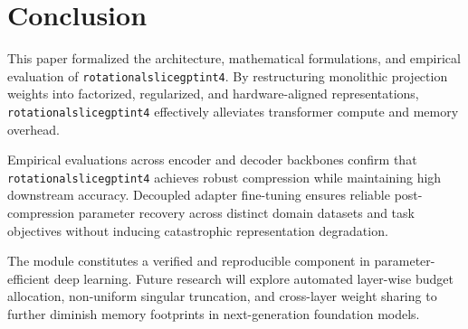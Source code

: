 \section{Conclusion}
This paper formalized the architecture, mathematical formulations, and empirical evaluation of \texttt{rotationalslicegptint4}. By restructuring monolithic projection weights into factorized, regularized, and hardware-aligned representations, \texttt{rotationalslicegptint4} effectively alleviates transformer compute and memory overhead.

Empirical evaluations across encoder and decoder backbones confirm that \texttt{rotationalslicegptint4} achieves robust compression while maintaining high downstream accuracy. Decoupled adapter fine-tuning ensures reliable post-compression parameter recovery across distinct domain datasets and task objectives without inducing catastrophic representation degradation.

The module constitutes a verified and reproducible component in parameter-efficient deep learning. Future research will explore automated layer-wise budget allocation, non-uniform singular truncation, and cross-layer weight sharing to further diminish memory footprints in next-generation foundation models.
